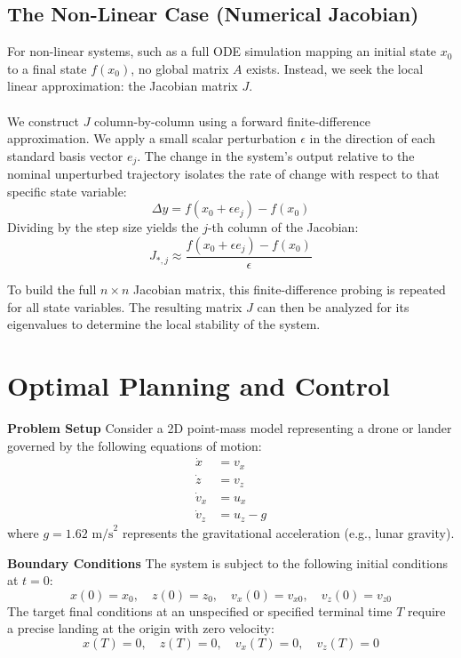 \documentclass{article}
\begin{document}
\subsection{The Non-Linear Case (Numerical Jacobian)}
For non-linear systems, such as a full ODE simulation mapping an initial state $x_0$ to a final state $f(x_0)$, no global matrix $A$ exists. Instead, we seek the local linear approximation: the Jacobian matrix $J$.\\
\\
We construct $J$ column-by-column using a forward finite-difference approximation. We apply a small scalar perturbation $\epsilon$ in the direction of each standard basis vector $e_j$. The change in the system's output relative to the nominal unperturbed trajectory isolates the rate of change with respect to that specific state variable:
\begin{equation}
    \Delta y = f(x_0 + \epsilon e_j) - f(x_0)
\end{equation}
Dividing by the step size yields the $j$-th column of the Jacobian:
\begin{equation}
    J_{*, j} \approx \frac{f(x_0 + \epsilon e_j) - f(x_0)}{\epsilon}
\end{equation}

To build the full $n \times n$ Jacobian matrix, this finite-difference probing is repeated for all state variables. The resulting matrix $J$ can then be analyzed for its eigenvalues to determine the local stability of the system.

\section{Optimal Planning and Control}

\textbf{Problem Setup}
Consider a 2D point-mass model representing a drone or lander governed by the following equations of motion:
\begin{align}
    \dot{x} &= v_x \\
    \dot{z} &= v_z \\
    \dot{v}_x &= u_x \\
    \dot{v}_z &= u_z - g
\end{align}
where $g = 1.62 \text{ m/s}^2$ represents the gravitational acceleration (e.g., lunar gravity).

\textbf{Boundary Conditions}
The system is subject to the following initial conditions at $t = 0$:
\begin{equation}
    x(0) = x_0, \quad z(0) = z_0, \quad v_x(0) = v_{x0}, \quad v_z(0) = v_{z0}
\end{equation}
The target final conditions at an unspecified or specified terminal time $T$ require a precise landing at the origin with zero velocity:
\begin{equation}
    x(T) = 0, \quad z(T) = 0, \quad v_x(T) = 0, \quad v_z(T) = 0
\end{equation}
\end{document}
